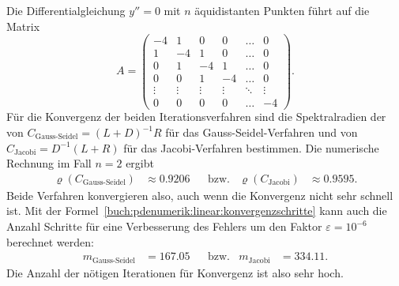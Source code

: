 \begin{beispiel}
Die Differentialgleichung $y''=0$ mit $n$ äquidistanten Punkten
führt auf die Matrix
\[
A
=
\begin{pmatrix}
    -4&     1&     0&     0& \dots &      0\\
     1&    -4&     1&     0& \dots &      0\\
     0&     1&    -4&     1& \dots &      0\\
     0&     0&     1&    -4& \dots &      0\\[-4pt]
\vdots&\vdots&\vdots&\vdots& \ddots& \vdots\\
     0&     0&     0&     0& \dots &     -4
\end{pmatrix}.
\]
Für die Konvergenz der beiden Iterationsverfahren sind die
Spektralradien der
von $C_{\text{Gauss-Seidel}}=(L+D)^{-1}R$ für das Gauss-Seidel-Verfahren
und
von $C_{\text{Jacobi}}=D^{-1}(L+R)$ für das Jacobi-Verfahren
bestimmen.
Die numerische Rechnung im Fall $n=2$ ergibt
\begin{align*}
\varrho(C_{\text{Gauss-Seidel}})
&\approx
0.9206
&&\text{bzw.}
&
\varrho(C_{\text{Jacobi}})
&\approx
0.9595.
\end{align*}
Beide Verfahren konvergieren also, auch wenn die Konvergenz nicht sehr schnell
ist.
Mit der Formel~\eqref{buch:pdenumerik:linear:konvergenzschritte}
kann auch die Anzahl Schritte für eine Verbesserung des Fehlers um den
Faktor $\varepsilon = 10^{-6}$ berechnet werden:
\begin{align*}
m_{\text{Gauss-Seidel}}
&=
167.05
&&\text{bzw.}&
m_{\text{Jacobi}}
&=
334.11.
\end{align*}
Die Anzahl der nötigen Iterationen für Konvergenz ist also sehr hoch.
\end{beispiel}



